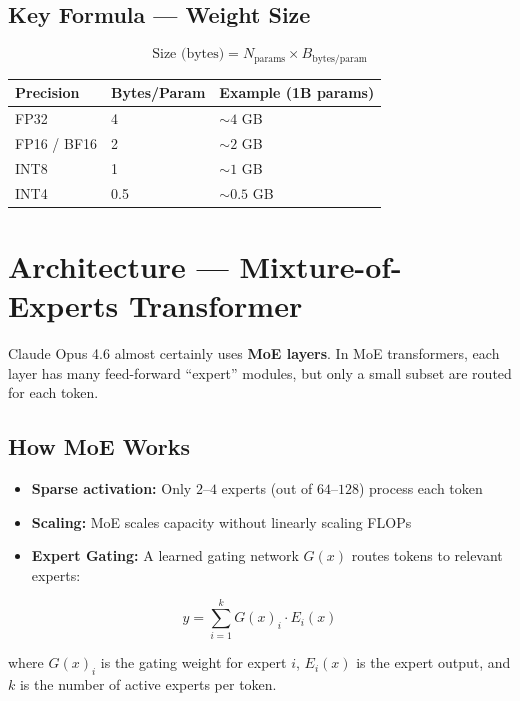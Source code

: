 \documentclass[11pt,a4paper]{article}
\begin{document}
\subsection{Key Formula --- Weight Size}

$$\text{Size (bytes)} = N_{\text{params}} \times B_{\text{bytes/param}}$$

\begin{center}
\begin{tabular}{lll}
\toprule
\textbf{Precision} & \textbf{Bytes/Param} & \textbf{Example (1B params)} \\
\midrule
FP32 & 4 & $\sim 4$ GB \\
FP16 / BF16 & 2 & $\sim 2$ GB \\
INT8 & 1 & $\sim 1$ GB \\
INT4 & 0.5 & $\sim 0.5$ GB \\
\bottomrule
\end{tabular}
\end{center}

\section{Architecture --- Mixture-of-Experts Transformer}

Claude Opus 4.6 almost certainly uses \textbf{MoE layers}. In MoE transformers, each layer has many feed-forward ``expert'' modules, but only a small subset are routed for each token.

\subsection{How MoE Works}

\begin{itemize}
  \item \textbf{Sparse activation:} Only $2\text{--}4$ experts (out of $64\text{--}128$) process each token
  \item \textbf{Scaling:} MoE scales capacity without linearly scaling FLOPs
  \item \textbf{Expert Gating:} A learned gating network $G(x)$ routes tokens to relevant experts:
\end{itemize}

$$y = \sum_{i=1}^{k} G(x)_i \cdot E_i(x)$$

where $G(x)_i$ is the gating weight for expert $i$, $E_i(x)$ is the expert output, and $k$ is the number of active experts per token.
\end{document}
